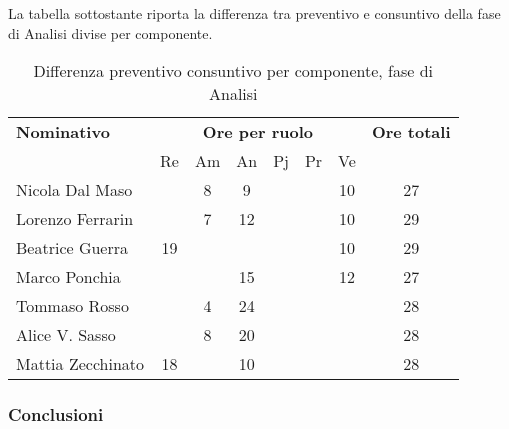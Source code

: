 La tabella sottostante riporta la differenza tra preventivo e consuntivo della fase di Analisi divise per componente.
\begin{table}[H]
	\centering
	\begin{tabular}{|l|c|c|c|c|c|c|c|}
		\hline
		\textbf{Nominativo} & 
		\multicolumn{6}{c|}{\textbf{Ore per ruolo}} & 
		\textbf{Ore totali} \\
		& Re & Am & An & Pj & Pr & Ve & \\
		\hline
		Nicola Dal Maso & & 8 & 9 & & & 10 & 27 \\
		Lorenzo Ferrarin & & 7 & 12 & & & 10 & 29 \\
		Beatrice Guerra & 19 & & & & & 10 & 29 \\
		Marco Ponchia & & & 15 & & & 12 & 27 \\
		Tommaso Rosso & & 4 & 24 & & & & 28 \\
		Alice V. Sasso & & 8 & 20 & & & & 28 \\
		Mattia Zecchinato & 18 & & 10 & & & & 28 \\
		\hline
	\end{tabular}
	\caption{Differenza preventivo consuntivo per componente, fase di Analisi}
\end{table}
\subsubsection{Conclusioni}

